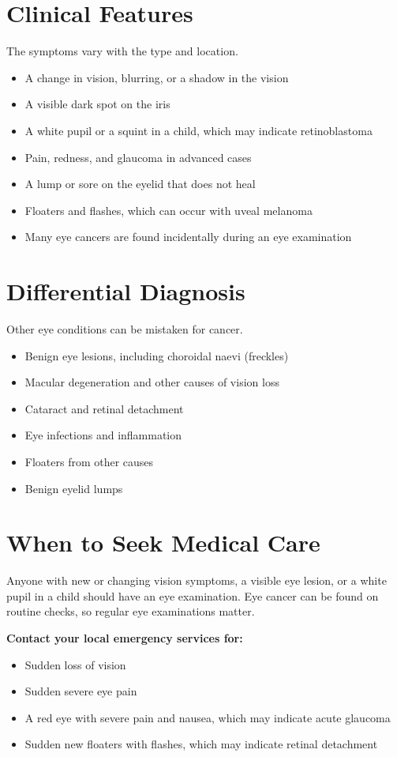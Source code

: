 \section*{Clinical Features}
The symptoms vary with the type and location.
\begin{itemize}
    \item A change in vision, blurring, or a shadow in the vision
    \item A visible dark spot on the iris
    \item A white pupil or a squint in a child, which may indicate retinoblastoma
    \item Pain, redness, and glaucoma in advanced cases
    \item A lump or sore on the eyelid that does not heal
    \item Floaters and flashes, which can occur with uveal melanoma
    \item Many eye cancers are found incidentally during an eye examination
\end{itemize}

\section*{Differential Diagnosis}
Other eye conditions can be mistaken for cancer.
\begin{itemize}
    \item Benign eye lesions, including choroidal naevi (freckles)
    \item Macular degeneration and other causes of vision loss
    \item Cataract and retinal detachment
    \item Eye infections and inflammation
    \item Floaters from other causes
    \item Benign eyelid lumps
\end{itemize}

\section*{When to Seek Medical Care}
Anyone with new or changing vision symptoms, a visible eye lesion, or a white pupil in a child should have an eye examination. Eye cancer can be found on routine checks, so regular eye examinations matter.

\textbf{Contact your local emergency services for:}
\begin{itemize}
    \item Sudden loss of vision
    \item Sudden severe eye pain
    \item A red eye with severe pain and nausea, which may indicate acute glaucoma
    \item Sudden new floaters with flashes, which may indicate retinal detachment
\end{itemize}

